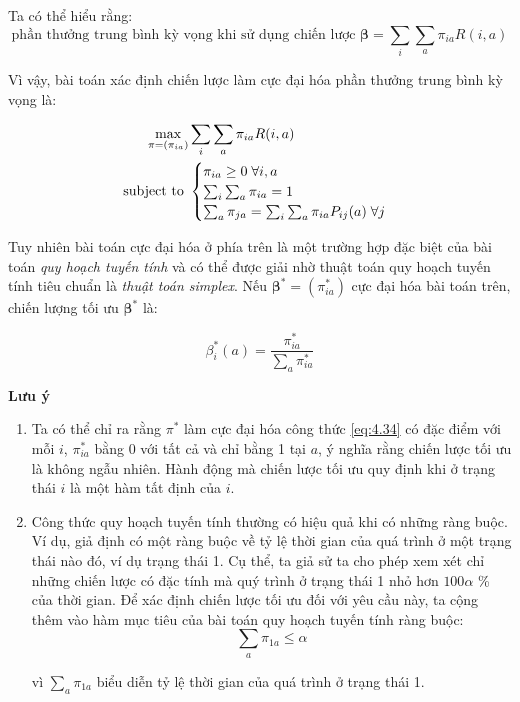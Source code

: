 \documentclass[14pt, a4paper]{article}
\numberwithin{equation}{section}
\numberwithin{figure}{section}
\theoremstyle{sltheorem}
\theoremstyle{soltheorem}
\numberwithin{dl}{section}
\numberwithin{md}{section}
\numberwithin{vd}{section}
\begin{document}
    Ta có thể hiểu rằng:
    \begin{equation*}
        \text{phần thưởng trung bình kỳ vọng khi sử dụng chiến lược } \boldsymbol{\beta} = \sum_i \sum_a \pi_{ia} R(i, a)
    \end{equation*}

    Vì vậy, bài toán xác định chiến lược làm cực đại hóa phần thưởng trung bình kỳ vọng là:

    \begin{equation} \label{eq:4.34}
        \begin{aligned}
            \max_{\pi=(\pi_{ia})} &\sum_i \sum_a \pi_{ia} R(i, a) \\
            \text{ subject to } &\begin{cases} 
                                    \pi_{ia} \geq 0 \thickspace \forall i, a \\
                                    \sum_i \sum_a \pi_{ia} = 1 \\
                                    \sum_a \pi_{ja} = \sum_i \sum_a \pi_{ia} P_{ij} (a) \thickspace \forall j
                                \end{cases} 
        \end{aligned}
    \end{equation}

    Tuy nhiên bài toán cực đại hóa ở phía trên là một trường hợp đặc biệt của bài toán \textit{quy hoạch tuyến tính} và có thể được giải nhờ thuật toán quy hoạch tuyến tính tiêu chuẩn là \textit{thuật toán simplex}.
    Nếu $\boldsymbol{\beta}^* = (\pi_{ia}^*)$ cực đại hóa bài toán trên, chiến lượng tối ưu $\boldsymbol{\beta}^*$ là:

    \begin{equation*}
        \beta_i^*(a) = \dfrac{\pi_{ia}^*}{\sum_a \pi_{ia}^*}
    \end{equation*}

    \textbf{Lưu ý}

    \begin{enumerate}[label=(\roman*)]
        \item Ta có thể chỉ ra rằng $\pi^*$ làm cực đại hóa công thức \ref{eq:4.34} có đặc điểm với mỗi $i$, $\pi_{ia}^*$ bằng 0 với tất cả và chỉ bằng 1 tại $a$, ý nghĩa rằng chiến lược tối ưu là không ngẫu nhiên. Hành động mà chiến lược tối ưu quy định khi ở trạng thái $i$ là một hàm tất định của $i$.
        \item Công thức quy hoạch tuyến tính thường có hiệu quả khi có những ràng buộc. Ví dụ, giả định có một ràng buộc về tỷ lệ thời gian của quá trình ở một trạng thái nào đó, ví dụ trạng thái 1. Cụ thể, ta giả sử ta cho phép xem xét chỉ những chiến lược có đặc tính mà quý trình ở trạng thái 1 nhỏ hơn $100 \alpha$ \% của thời gian. Để xác định chiến lược tối ưu đối với yêu cầu này, ta cộng thêm vào hàm mục tiêu của bài toán quy hoạch tuyến tính ràng buộc:
        \begin{equation*}
            \sum_a \pi_{1a} \leq \alpha
        \end{equation*}

        vì $\sum_a \pi_{1a}$ biểu diễn tỷ lệ thời gian của quá trình ở trạng thái 1.
    \end{enumerate}
\end{document}
